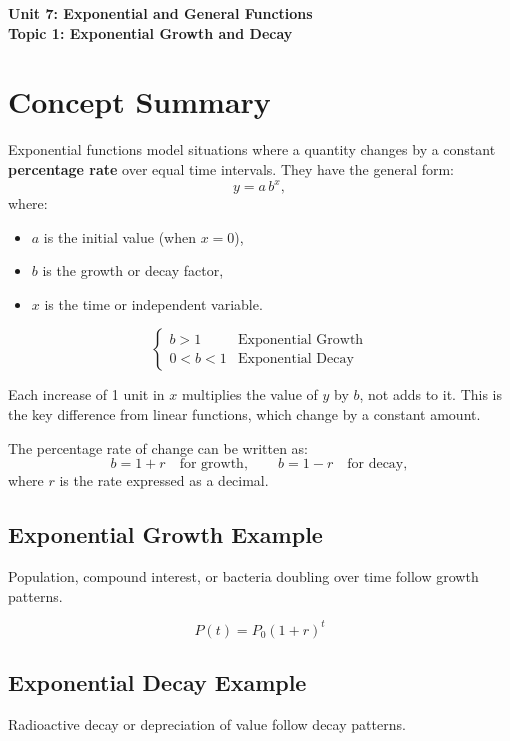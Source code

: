 \documentclass[14pt]{extarticle}
\begin{document}
\raggedright
{}

\begin{center}
    \LARGE \textbf{Unit 7: Exponential and General Functions} \\[6pt]
    \Large \textbf{Topic 1: Exponential Growth and Decay}
\end{center}

\vspace{1em}

\section*{Concept Summary}

Exponential functions model situations where a quantity changes by a constant \textbf{percentage rate} over equal time intervals.  
They have the general form:
\[
y = a \, b^x,
\]
where:
\begin{itemize}
  \item \(a\) is the initial value (when \(x = 0\)),
  \item \(b\) is the growth or decay factor,
  \item \(x\) is the time or independent variable.
\end{itemize}

\[
\begin{cases}
b > 1 & \text{Exponential Growth} \\
0 < b < 1 & \text{Exponential Decay}
\end{cases}
\]

Each increase of 1 unit in \(x\) multiplies the value of \(y\) by \(b\), not adds to it.  
This is the key difference from linear functions, which change by a constant amount.

The percentage rate of change can be written as:
\[
b = 1 + r \quad \text{for growth}, \qquad b = 1 - r \quad \text{for decay},
\]
where \(r\) is the rate expressed as a decimal.

\subsection*{Exponential Growth Example}
Population, compound interest, or bacteria doubling over time follow growth patterns.

\[
P(t) = P_0 (1 + r)^t
\]

\subsection*{Exponential Decay Example}
Radioactive decay or depreciation of value follow decay patterns.
\end{document}
